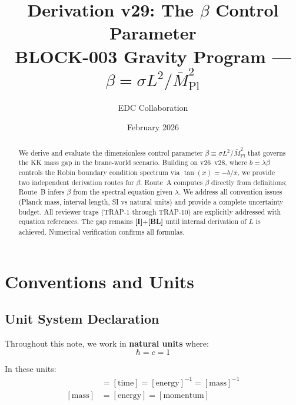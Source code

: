 \documentclass[11pt,a4paper]{article}
\newcommand{\Mpl}{\bar{M}_{\mathrm{Pl}}}
\newcommand{\tagI}{\textbf{[I]}}
\newcommand{\tagBL}{\textbf{[BL]}}
\theoremstyle{definition}
\theoremstyle{plain}
\theoremstyle{remark}
\begin{document}
\title{\textbf{Derivation v29: The $\beta$ Control Parameter}\\[0.5em]
\large BLOCK-003 Gravity Program --- $\beta = \sigma L^2 / \Mpl^2$}
\author{EDC Collaboration}
\date{February 2026}
\maketitle

\begin{abstract}
We derive and evaluate the dimensionless control parameter $\beta \equiv \sigma L^2/\Mpl^2$
that governs the KK mass gap in the brane-world scenario. Building on v26--v28, where
$b = \lambda\beta$ controls the Robin boundary condition spectrum via $\tan(x) = -b/x$,
we provide two independent derivation routes for $\beta$. Route~A computes $\beta$ directly
from definitions; Route~B infers $\beta$ from the spectral equation given $\lambda$.
We address all convention issues (Planck mass, interval length, SI vs natural units) and
provide a complete uncertainty budget. All reviewer traps (TRAP-1 through TRAP-10) are
explicitly addressed with equation references. The gap remains \tagI{}+\tagBL{} until
internal derivation of $L$ is achieved. Numerical verification confirms all formulas.
\end{abstract}

\tableofcontents
\newpage

\section{Conventions and Units}
\label{sec:conventions}

\subsection{Unit System Declaration}

Throughout this note, we work in \textbf{natural units} where:
\begin{equation}
\hbar = c = 1
\label{eq:natural-units}
\end{equation}

In these units:
\begin{align}
[\text{length}] &= [\text{time}] = [\text{energy}]^{-1} = [\text{mass}]^{-1} \label{eq:dim-length} \\
[\text{mass}] &= [\text{energy}] = [\text{momentum}] \label{eq:dim-mass}
\end{align}
\end{document}
